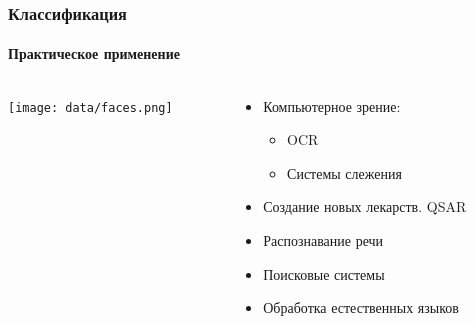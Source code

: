 \documentclass[xcolor=table]{beamer}
\begin{document}
\begin{frame}
  \frametitle{Классификация}
  \framesubtitle{Практическое применение}

  \begin{columns}

  \begin{column}{0.5\textwidth}
    {\texttt{[image: data/faces.png]}}
  \end{column}

  \begin{column}{0.5\textwidth}
    \begin{itemize}
    \item Компьютерное зрение:
      \begin{itemize}
      \item OCR
      \item Системы слежения
      \end{itemize}
    \item Создание новых лекарств. QSAR
    \item Распознавание речи
    \item Поисковые системы
    \item Обработка естественных языков
    \end{itemize}
    \end{column}
  \end{columns}
\end{frame}
\end{document}
